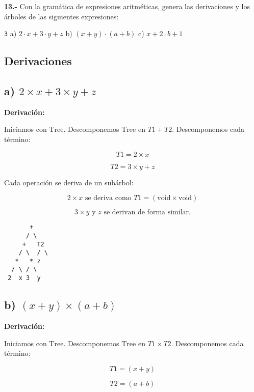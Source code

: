 \textbf{13.-} Con la gramática de expresiones aritméticas, genera las derivaciones y los árboles de las siguientes expresiones:

\texttt3 { 
a) \(2 \cdot x + 3 \cdot y + z\)
b) \((x + y) \cdot (a + b)\)
c) \(x + 2 \cdot b + 1\)
}


\subsection*{Derivaciones}

\subsection*{a) \(2 \times x + 3 \times y + z\)}

\textbf{Derivación:}

Iniciamos con \( \text{Tree} \). Descomponemos \( \text{Tree} \) en \( T1 + T2 \). Descomponemos cada término:

\[
T1 = 2 \times x
\]

\[
T2 = 3 \times y + z
\]

Cada operación se deriva de un subárbol:

\[
2 \times x \text{ se deriva como } T1 = ( \text{void} \times \text{void} )
\]

\[
3 \times y \text{ y } z \text{ se derivan de forma similar.}
\]

\vspace*{\fill}
\begin{center}
\begin{minipage}{0.2\linewidth}
\centering
\begin{verbatim}
       +
      / \
     +   T2
    / \  / \
   *   * z
  / \ / \
 2  x 3  y

\end{verbatim}
\end{minipage}
\end{center}
\vspace*{\fill}

\subsection*{b) \((x + y) \times (a + b)\)}

\textbf{Derivación:}

Iniciamos con \( \text{Tree} \). Descomponemos \( \text{Tree} \) en \( T1 \times T2 \). Descomponemos cada término:

\[
T1 = (x + y)
\]

\[
T2 = (a + b)
\]

